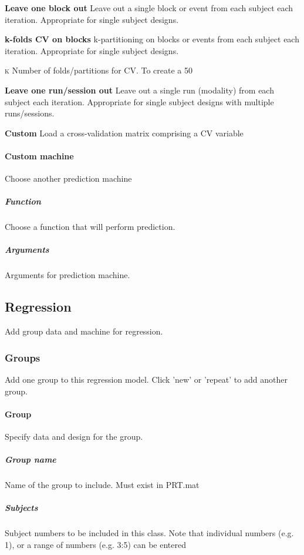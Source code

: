 \textbf{Leave one block out}
Leave out a single block or event from each subject each iteration. Appropriate for single subject designs.


\textbf{k-folds CV on blocks}
k-partitioning on blocks or events from each subject each iteration. Appropriate for single subject designs.


\textsc{k}
Number of folds/partitions for CV. To create a 50%


\textbf{Leave one run/session out}
Leave out a single run (modality) from each subject each iteration. Appropriate for single subject designs with multiple runs/sessions.


\textbf{Custom}
Load a cross-validation matrix comprising a CV variable


\paragraph{Custom machine}
Choose another prediction machine


\subparagraph{Function}
Choose a function that will perform prediction.


\subparagraph{Arguments}
Arguments for prediction machine.


\subsection{Regression}
Add group data and machine for regression.


\subsubsection{Groups}
Add one group to this regression model. Click 'new' or 'repeat' to add another group.


\paragraph{Group}
Specify data and design for the group.


\subparagraph{Group name}
Name of the group to include. Must exist in PRT.mat


\subparagraph{Subjects}
Subject numbers to be included in this class. Note that individual numbers (e.g. 1), or a range of numbers (e.g. 3:5) can be entered



